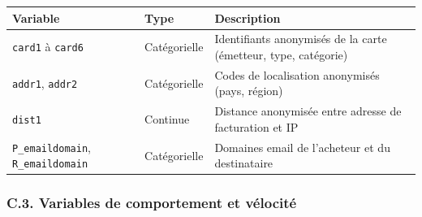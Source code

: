 \documentclass[
  12pt,
]{article}
\newcounter{none} %
\begin{document}
{\def\LTcaptype{none} %
\begin{longtable}[]{@{}
  >{\raggedright\arraybackslash}p{}
  >{\raggedright\arraybackslash}p{}
  >{\raggedright\arraybackslash}p{}@{}}
\toprule\noalign{}
\begin{minipage}[b]{\linewidth}\raggedright
Variable
\end{minipage} & \begin{minipage}[b]{\linewidth}\raggedright
Type
\end{minipage} & \begin{minipage}[b]{\linewidth}\raggedright
Description
\end{minipage} \\
\midrule\noalign{}
\endhead
\bottomrule\noalign{}
\endlastfoot
\texttt{card1} à \texttt{card6} & Catégorielle & Identifiants anonymisés
de la carte (émetteur, type, catégorie) \\
\texttt{addr1}, \texttt{addr2} & Catégorielle & Codes de localisation
anonymisés (pays, région) \\
\texttt{dist1} & Continue & Distance anonymisée entre adresse de
facturation et IP \\
\texttt{P\_emaildomain}, \texttt{R\_emaildomain} & Catégorielle &
Domaines email de l’acheteur et du destinataire \\
\end{longtable}
}

\subsubsection{C.3. Variables de comportement et
vélocité}\label{c.3.-variables-de-comportement-et-vuxe9locituxe9}
\end{document}
